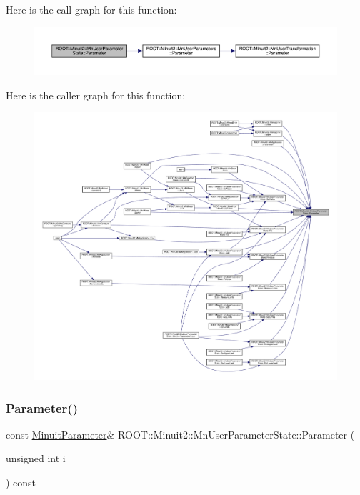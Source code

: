 Here is the call graph for this function\+:
\nopagebreak
\begin{figure}[H]
\begin{center}
\leavevmode
\includegraphics[width=350pt]{d3/de0/classROOT_1_1Minuit2_1_1MnUserParameterState_a8a3fa916f75abaa442d96ab3af55a5af_cgraph}
\end{center}
\end{figure}
Here is the caller graph for this function\+:
\nopagebreak
\begin{figure}[H]
\begin{center}
\leavevmode
\includegraphics[width=350pt]{d3/de0/classROOT_1_1Minuit2_1_1MnUserParameterState_a8a3fa916f75abaa442d96ab3af55a5af_icgraph}
\end{center}
\end{figure}
\mbox{\label{classROOT_1_1Minuit2_1_1MnUserParameterState_a8fc15966c5874962bb278d4032a312d3}} 
\subsubsection{\texorpdfstring{Parameter()}{Parameter()}\hspace{0.1cm}{\footnotesize\ttfamily [3/3]}}
{\footnotesize\ttfamily const \mbox{\hyperlink{classROOT_1_1Minuit2_1_1MinuitParameter}{Minuit\+Parameter}}\& R\+O\+O\+T\+::\+Minuit2\+::\+Mn\+User\+Parameter\+State\+::\+Parameter (\begin{DoxyParamCaption}\item[{unsigned int}]{i }\end{DoxyParamCaption}) const}

